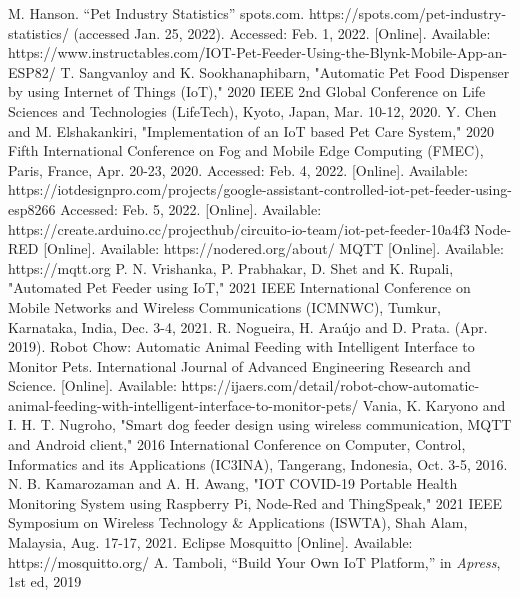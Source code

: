 ﻿\documentclass[conference]{IEEEtran}
\begin{document}
\begin{thebibliography}{00}
M.  Hanson.  “Pet  Industry  Statistics”  spots.com.  https://spots.com/pet-industry-statistics/ (accessed Jan. 25, 2022). 
Accessed: Feb. 1, 2022. [Online]. Available: https://www.instructables.com/IOT-Pet-Feeder-Using-the-Blynk-Mobile-App-an-ESP82/
T. Sangvanloy and K. Sookhanaphibarn, "Automatic Pet Food Dispenser by using Internet of Things (IoT)," 2020 IEEE 2nd Global Conference on Life Sciences and Technologies (LifeTech), Kyoto, Japan, Mar. 10-12, 2020.
Y. Chen and M. Elshakankiri, "Implementation of an IoT based Pet Care System," 2020 Fifth International Conference on Fog and Mobile Edge Computing (FMEC), Paris, France, Apr. 20-23, 2020.
Accessed: Feb. 4, 2022. [Online]. Available: https://iotdesignpro.com/projects/google-assistant-controlled-iot-pet-feeder-using-esp8266
Accessed: Feb. 5, 2022. [Online]. Available: https://create.arduino.cc/projecthub/circuito-io-team/iot-pet-feeder-10a4f3
Node-RED [Online]. Available: https://nodered.org/about/
MQTT [Online]. Available: https://mqtt.org
P. N. Vrishanka, P. Prabhakar, D. Shet and K. Rupali, "Automated Pet Feeder using IoT," 2021 IEEE International Conference on Mobile Networks and Wireless Communications (ICMNWC), Tumkur, Karnataka, India, Dec. 3-4, 2021.
R. Nogueira, H. Araújo and D. Prata. (Apr. 2019). Robot Chow: Automatic Animal Feeding with Intelligent Interface to Monitor Pets. International Journal of Advanced Engineering Research and Science. [Online]. Available: https://ijaers.com/detail/robot-chow-automatic-animal-feeding-with-intelligent-interface-to-monitor-pets/
Vania, K. Karyono and I. H. T. Nugroho, "Smart dog feeder design using wireless communication, MQTT and Android client," 2016 International Conference on Computer, Control, Informatics and its Applications (IC3INA), Tangerang, Indonesia, Oct. 3-5, 2016.
N. B. Kamarozaman and A. H. Awang, "IOT COVID-19 Portable Health Monitoring System using Raspberry Pi, Node-Red and ThingSpeak," 2021 IEEE Symposium on Wireless Technology \& Applications (ISWTA), Shah Alam, Malaysia, Aug. 17-17, 2021.
Eclipse Mosquitto [Online]. Available: https://mosquitto.org/
A. Tamboli, “Build Your Own IoT Platform,” in \textit{Apress}, 1st ed, 2019

\end{thebibliography}
\vspace{12pt}
\end{document}
